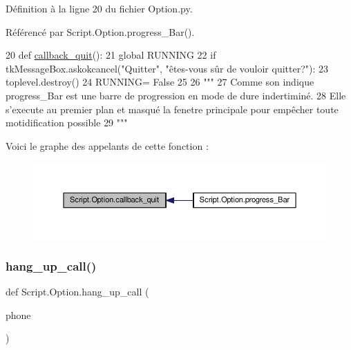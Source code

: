 Définition à la ligne 20 du fichier Option.\+py.



Référencé par Script.\+Option.\+progress\+\_\+\+Bar().


\begin{DoxyCode}
20 \textcolor{keyword}{def }\hyperlink{namespaceScript_1_1Option_abb674ebac6565861fc8240a9306f8ecd}{callback\_quit}():
21     \textcolor{keyword}{global} RUNNING
22     \textcolor{keywordflow}{if} tkMessageBox.askokcancel(\textcolor{stringliteral}{"Quitter"}, \textcolor{stringliteral}{"êtes-vous sûr de vouloir quitter?"}):
23         toplevel.destroy()
24         RUNNING= \textcolor{keyword}{False}
25 
26 \textcolor{stringliteral}{"""
}
27 \textcolor{stringliteral}{Comme son indique progress\_Bar est une barre de progression en mode de dure indertiminé. 
}
28 \textcolor{stringliteral}{Elle s'execute au premier plan et masqué la fenetre principale pour empêcher toute motidification possible
}
29 \textcolor{stringliteral}{"""}
\end{DoxyCode}
Voici le graphe des appelants de cette fonction \+:\nopagebreak
\begin{figure}[H]
\begin{center}
\leavevmode
\includegraphics[width=350pt]{namespaceScript_1_1Option_abb674ebac6565861fc8240a9306f8ecd_icgraph}
\end{center}
\end{figure}
\mbox{\label{namespaceScript_1_1Option_a22c03fd81ddb28ef13f194565b4996ba}} 
\subsubsection{\texorpdfstring{hang\+\_\+up\+\_\+call()}{hang\_up\_call()}}
{\footnotesize\ttfamily def Script.\+Option.\+hang\+\_\+up\+\_\+call (\begin{DoxyParamCaption}\item[{}]{phone }\end{DoxyParamCaption})}



